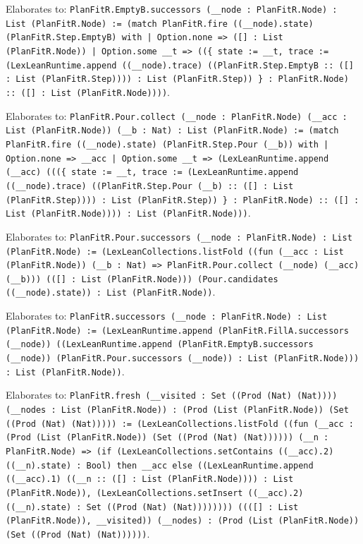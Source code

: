 \documentclass[11pt]{article}
\begin{document}
\noindent Elaborates to: \texttt{PlanFitR.EmptyB.successors (\_\_node : PlanFitR.Node) : List (PlanFitR.Node) := (match PlanFitR.fire ((\_\_node).state) (PlanFitR.Step.EmptyB) with | Option.none => ([] : List (PlanFitR.Node)) | Option.some \_\_t => ((\{ state := \_\_t, trace := (LexLeanRuntime.append ((\_\_node).trace) ((PlanFitR.Step.EmptyB :: ([] : List (PlanFitR.Step)))) : List (PlanFitR.Step)) \} : PlanFitR.Node) :: ([] : List (PlanFitR.Node))))}.\par
\noindent Elaborates to: \texttt{PlanFitR.Pour.collect (\_\_node : PlanFitR.Node) (\_\_acc : List (PlanFitR.Node)) (\_\_b : Nat) : List (PlanFitR.Node) := (match PlanFitR.fire ((\_\_node).state) (PlanFitR.Step.Pour (\_\_b)) with | Option.none => \_\_acc | Option.some \_\_t => (LexLeanRuntime.append (\_\_acc) (((\{ state := \_\_t, trace := (LexLeanRuntime.append ((\_\_node).trace) ((PlanFitR.Step.Pour (\_\_b) :: ([] : List (PlanFitR.Step)))) : List (PlanFitR.Step)) \} : PlanFitR.Node) :: ([] : List (PlanFitR.Node)))) : List (PlanFitR.Node)))}.\par
\noindent Elaborates to: \texttt{PlanFitR.Pour.successors (\_\_node : PlanFitR.Node) : List (PlanFitR.Node) := (LexLeanCollections.listFold ((fun (\_\_acc : List (PlanFitR.Node)) (\_\_b : Nat) => PlanFitR.Pour.collect (\_\_node) (\_\_acc) (\_\_b))) (([] : List (PlanFitR.Node))) (Pour.candidates ((\_\_node).state)) : List (PlanFitR.Node))}.\par
\noindent Elaborates to: \texttt{PlanFitR.successors (\_\_node : PlanFitR.Node) : List (PlanFitR.Node) := (LexLeanRuntime.append (PlanFitR.FillA.successors (\_\_node)) ((LexLeanRuntime.append (PlanFitR.EmptyB.successors (\_\_node)) (PlanFitR.Pour.successors (\_\_node)) : List (PlanFitR.Node))) : List (PlanFitR.Node))}.\par
\noindent Elaborates to: \texttt{PlanFitR.fresh (\_\_visited : Set ((Prod (Nat) (Nat)))) (\_\_nodes : List (PlanFitR.Node)) : (Prod (List (PlanFitR.Node)) (Set ((Prod (Nat) (Nat))))) := (LexLeanCollections.listFold ((fun (\_\_acc : (Prod (List (PlanFitR.Node)) (Set ((Prod (Nat) (Nat)))))) (\_\_n : PlanFitR.Node) => (if (LexLeanCollections.setContains ((\_\_acc).2) ((\_\_n).state) : Bool) then \_\_acc else ((LexLeanRuntime.append ((\_\_acc).1) ((\_\_n :: ([] : List (PlanFitR.Node)))) : List (PlanFitR.Node)), (LexLeanCollections.setInsert ((\_\_acc).2) ((\_\_n).state) : Set ((Prod (Nat) (Nat)))))))) ((([] : List (PlanFitR.Node)), \_\_visited)) (\_\_nodes) : (Prod (List (PlanFitR.Node)) (Set ((Prod (Nat) (Nat))))))}.\par
\end{document}
